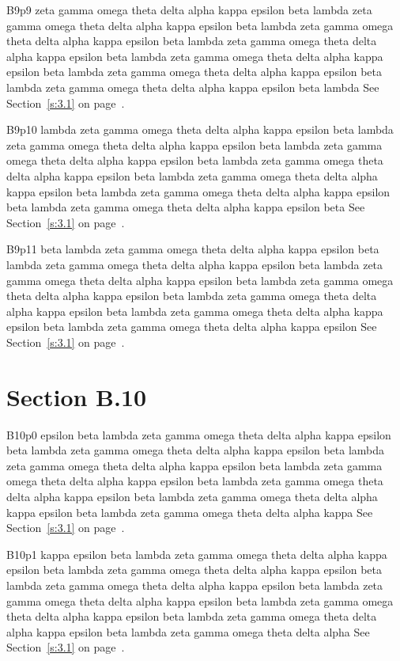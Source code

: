 B9p9 zeta gamma omega theta delta alpha kappa epsilon beta lambda zeta gamma omega theta delta alpha kappa epsilon beta lambda zeta gamma omega theta delta alpha kappa epsilon beta lambda zeta gamma omega theta delta alpha kappa epsilon beta lambda zeta gamma omega theta delta alpha kappa epsilon beta lambda zeta gamma omega theta delta alpha kappa epsilon beta lambda zeta gamma omega theta delta alpha kappa epsilon beta lambda See Section~\ref{s:3.1} on page~\pageref{s:3.1}.

B9p10 lambda zeta gamma omega theta delta alpha kappa epsilon beta lambda zeta gamma omega theta delta alpha kappa epsilon beta lambda zeta gamma omega theta delta alpha kappa epsilon beta lambda zeta gamma omega theta delta alpha kappa epsilon beta lambda zeta gamma omega theta delta alpha kappa epsilon beta lambda zeta gamma omega theta delta alpha kappa epsilon beta lambda zeta gamma omega theta delta alpha kappa epsilon beta See Section~\ref{s:3.1} on page~\pageref{s:3.1}.

B9p11 beta lambda zeta gamma omega theta delta alpha kappa epsilon beta lambda zeta gamma omega theta delta alpha kappa epsilon beta lambda zeta gamma omega theta delta alpha kappa epsilon beta lambda zeta gamma omega theta delta alpha kappa epsilon beta lambda zeta gamma omega theta delta alpha kappa epsilon beta lambda zeta gamma omega theta delta alpha kappa epsilon beta lambda zeta gamma omega theta delta alpha kappa epsilon See Section~\ref{s:3.1} on page~\pageref{s:3.1}.

\section{Section B.10}\label{s:B.10}
B10p0 epsilon beta lambda zeta gamma omega theta delta alpha kappa epsilon beta lambda zeta gamma omega theta delta alpha kappa epsilon beta lambda zeta gamma omega theta delta alpha kappa epsilon beta lambda zeta gamma omega theta delta alpha kappa epsilon beta lambda zeta gamma omega theta delta alpha kappa epsilon beta lambda zeta gamma omega theta delta alpha kappa epsilon beta lambda zeta gamma omega theta delta alpha kappa See Section~\ref{s:3.1} on page~\pageref{s:3.1}.

B10p1 kappa epsilon beta lambda zeta gamma omega theta delta alpha kappa epsilon beta lambda zeta gamma omega theta delta alpha kappa epsilon beta lambda zeta gamma omega theta delta alpha kappa epsilon beta lambda zeta gamma omega theta delta alpha kappa epsilon beta lambda zeta gamma omega theta delta alpha kappa epsilon beta lambda zeta gamma omega theta delta alpha kappa epsilon beta lambda zeta gamma omega theta delta alpha See Section~\ref{s:3.1} on page~\pageref{s:3.1}.

